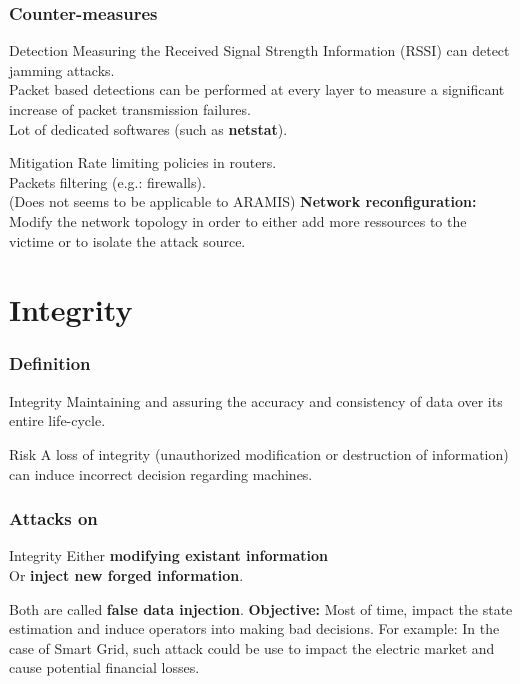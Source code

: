 \documentclass{beamer}
\begin{document}
\begin{frame}
    \frametitle{Counter-measures}

    \begin{block}{Detection}
        Measuring the Received Signal Strength Information (RSSI) can detect jamming attacks.\\
        Packet based detections can be performed at every layer to measure a significant increase of packet transmission failures.\\
        \medskip
        Lot of dedicated softwares (such as {\bf netstat}).
    \end{block}
    \vfill
    \begin{block}{Mitigation}
        Rate limiting policies in routers.\\
        Packets filtering (e.g.: firewalls).\\
        \medskip
        (Does not seems to be applicable to ARAMIS) {\bf Network reconfiguration:} Modify the network topology in order to either add more ressources to the victime or to isolate the attack source.
    \end{block}
\end{frame}

\section{Integrity}

\begin{frame}
    \tableofcontents[currentsection]
\end{frame}

\begin{frame}
    \frametitle{Definition}

    \begin{block}{Integrity}
         Maintaining and assuring the accuracy and consistency of data over its entire life-cycle.
    \end{block}
    \vfill
    \begin{block}{Risk}
        A loss of integrity (unauthorized modification or destruction of information) can induce incorrect decision regarding machines.
    \end{block}
\end{frame}

\begin{frame}
    \frametitle{Attacks on }

    \begin{block}{Integrity}
        Either {\bf modifying existant information}\\
        \medskip
        Or {\bf inject new forged information}.
    \end{block}
    \vfill
    Both are called {\bf false data injection}.
    \vfill
    {\bf Objective:} Most of time, impact the state estimation and induce operators into making bad decisions.
    \vfill
    For example: In the case of Smart Grid, such attack could be use to impact the electric market and cause potential financial losses.
\end{frame}
\end{document}
